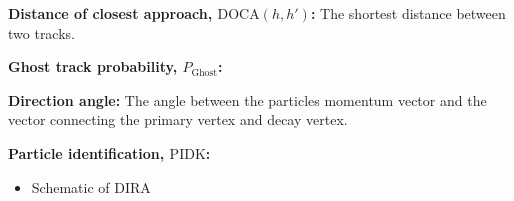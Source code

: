 \begin{description}
\item \textbf{Distance of closest approach, $\text{DOCA}(h,h')$:} The shortest distance between two tracks.
\item \textbf{Ghost track probability, $P_{\text{Ghost}}$:} 
\item \textbf{Direction angle:} The angle between the particles momentum vector and the vector connecting the primary vertex and decay vertex.

\item \textbf{Particle identification, $\text{PIDK}$:}  
\end{description}

{\color{Green}
\begin{itemize}
\item Schematic of DIRA
\end{itemize}
}



